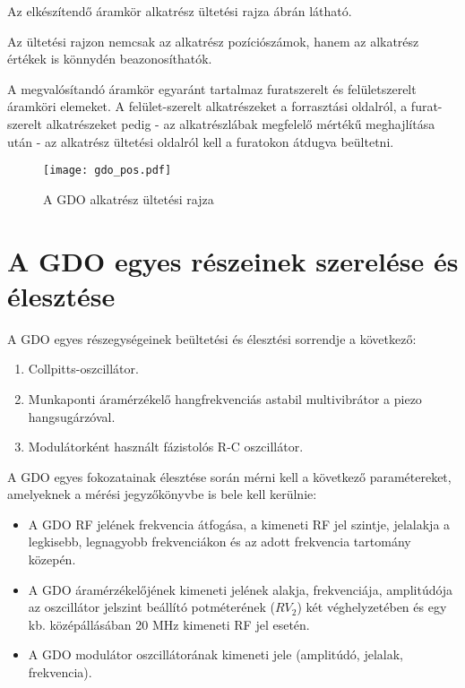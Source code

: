 Az elkészítendő áramkör alkatrész ültetési rajza  ábrán látható.

Az ültetési rajzon nemcsak az alkatrész pozíciószámok, hanem az alkatrész értékek is könnydén beazonosíthatók.

A megvalósítandó áramkör egyaránt tartalmaz furatszerelt és felületszerelt áramköri elemeket. A felület-szerelt alkatrészeket a forrasztási oldalról, a furat-szerelt alkatrészeket pedig - az alkatrészlábak megfelelő mértékű meghajlítása után - az alkatrész ültetési oldalról kell a furatokon átdugva beültetni.

\begin{figure}[!ht]
\centering
\texttt{[image: gdo\_pos.pdf]}
\caption{A GDO alkatrész ültetési rajza}
\label{fig:gdopos} 
\end{figure}

\section{A GDO egyes részeinek szerelése és élesztése}

A GDO egyes részegységeinek beültetési és élesztési sorrendje a következő:

\begin{enumerate}
\item
Collpitts-oszcillátor.
\item
Munkaponti áramérzékelő hangfrekvenciás astabil multivibrátor a piezo hangsugárzóval.
\item
Modulátorként használt fázistolós R-C oszcillátor.
\end{enumerate}

A GDO egyes fokozatainak élesztése során mérni kell a következő paramétereket, amelyeknek a mérési jegyzőkönyvbe is bele kell kerülnie:

\begin{itemize}
\item
A GDO RF jelének frekvencia átfogása, a kimeneti RF jel szintje, jelalakja a legkisebb, legnagyobb frekvenciákon és az adott frekvencia tartomány közepén.
\item
A GDO áramérzékelőjének kimeneti jelének alakja, frekvenciája, amplitúdója az oszcillátor jelszint beállító potméterének ($RV_2$) két véghelyzetében és egy kb. középállásában 20 MHz kimeneti RF jel esetén.
\item
A GDO modulátor oszcillátorának kimeneti jele (amplitúdó, jelalak, frekvencia).
\end{itemize}

